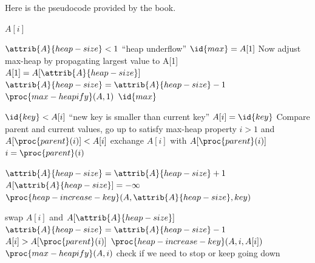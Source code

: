 \documentclass{article}
\begin{document}
\newpage

Here is the pseudocode provided by the book.
\begin{codebox}
\li \Return $A[i]$
\end{codebox}

\begin{codebox}
\li \If $\attrib{A}{heap-size} < 1$
\li \Then
        \Error ``heap underflow''
    \End
\li $\id{max} = A[1]$
\li \Comment Now adjust max-heap by propagating largest value to A[1]
\li $A[1] = A[\attrib{A}{heap-size}]$
\li $\attrib{A}{heap-size} = \attrib{A}{heap-size} - 1$
\li $\proc{max-heapify}(A, 1)$
\li \Return $\id{max}$
\end{codebox}

\begin{codebox}
\li \If $\id{key} < A[i]$
\li \Then
        \Error ``new key is smaller than current key''
    \End
\li $A[i] = \id{key}$
\li \Comment Compare parent and current values, go up to satisfy max-heap property
\li \While $i >  1$ and $A[\proc{parent}(i)] < A[i]$
\li \Do
        exchange $A[i]$ with $A[\proc{parent}(i)]$
\li     $i = \proc{parent}(i)$
    \End
\end{codebox}

\begin{codebox}
\li $\attrib{A}{heap-size} = \attrib{A}{heap-size} + 1$
\li $A[\attrib{A}{heap-size}] = -\infty$
\li $\proc{heap-increase-key}(A, \attrib{A}{heap-size}, key)$
\end{codebox}

\begin{codebox}
\li swap $A[i]$ and $A[\attrib{A}{heap-size}]$
\li $\attrib{A}{heap-size} = \attrib{A}{heap-size} - 1$
\li \If $A[i] > A[\proc{parent}(i)]$
\li \Then
        $\proc{heap-increase-key}(A, i, A[i])$
    \End
\li \Else
\li \Then
        $\proc{max-heapify}(A, i)$ \Comment check if we need to stop or keep going down
    \End
\end{codebox}
\end{document}

